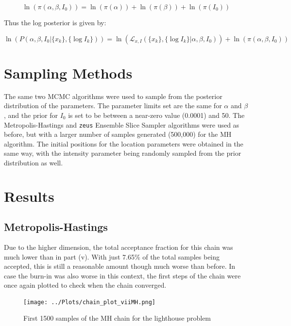 \documentclass[12pt]{report} %
\begin{document}
\begin{equation}
    \ln(\pi(\alpha, \beta, I_{0})) = \ln(\pi(\alpha)) + \ln(\pi(\beta)) + \ln(\pi(I_{0}))
\end{equation}

Thus the log posterior is given by:

\begin{equation}
    \ln(P(\alpha, \beta, I_{0} | \{x_{k}\}, \{\log I_{k}\})) = \ln(\mathcal{L}_{x, I}(\{x_{k}\}, \{\log I_{k}\} | \alpha, \beta, I_{0})) + \ln(\pi(\alpha, \beta, I_{0}))
\end{equation}

\section{Sampling Methods}

The same two MCMC algorithms were used to sample from the posterior distribution of the parameters. The parameter limits set are the same for $\alpha$ and $\beta$, and the prior for $I_{0}$ is set to be between a near-zero value (0.0001) and 50. The Metropolis-Hastings and \texttt{zeus} Ensemble Slice Sampler algorithms were used as before, but with a larger number of samples generated (500,000) for the MH algorithm. The initial positions for the location parameters were obtained in the same way, with the intensity parameter being randomly sampled from the prior distribution as well.

\section{Results}

\subsection{Metropolis-Hastings}

Due to the higher dimension, the total acceptance fraction for this chain was much lower than in part (v). With just 7.65\% of the total samples being accepted, this is still a reasonable amount though much worse than before. In case the burn-in was also worse in this context, the first steps of the chain were once again plotted to check when the chain converged.

\begin{figure}[h]
\centering
\texttt{[image: ../Plots/chain\_plot\_viiMH.png]}
\caption{First 1500 samples of the MH chain for the lighthouse problem}
\label{fig:MH_convergence_vii}
\end{figure}
\end{document}
